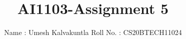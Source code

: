 \documentclass[journal,12pt,twocolumn]{IEEEtran}
\DeclareMathOperator*{\Res}{Res}
\begin{document}
\newcommand{\BEQA}{\begin{eqnarray}}
\newcommand{\EEQA}{\end{eqnarray}}
\newcommand{\define}{\stackrel{\triangle}{=}}
\newcommand{\R}{\mathbb{R}}

\raggedbottom
\setlength{\parindent}{0pt}
\providecommand{\mbf}{\mathbf}
\providecommand{\pr}[1]{\ensuremath{\Pr\left(#1\right)}}
\providecommand{\qfunc}[1]{\ensuremath{Q\left(#1\right)}}
\providecommand{\sbrak}[1]{\ensuremath{{}\left[#1\right]}}
\providecommand{\lsbrak}[1]{\ensuremath{{}\left[#1\right.}}
\providecommand{\rsbrak}[1]{\ensuremath{{}\left.#1\right]}}
\providecommand{\brak}[1]{\ensuremath{\left(#1\right)}}
\providecommand{\lbrak}[1]{\ensuremath{\left(#1\right.}}
\providecommand{\rbrak}[1]{\ensuremath{\left.#1\right)}}
\providecommand{\cbrak}[1]{\ensuremath{\left\{#1\right\}}}
\providecommand{\lcbrak}[1]{\ensuremath{\left\{#1\right.}}
\providecommand{\rcbrak}[1]{\ensuremath{\left.#1\right\}}}
\theoremstyle{remark}
\newtheorem{rem}{Remark}
\newcommand{\sgn}{\mathop{\mathrm{sgn}}}
\providecommand{\abs}[1]{\vert#1\vert}
\providecommand{\res}[1]{\Res\displaylimits_{#1}} 
\providecommand{\norm}[1]{\lVert#1\rVert}
\providecommand{\mtx}[1]{\mathbf{#1}}
\providecommand{\mean}[1]{E[ #1 ]}
\providecommand{\fourier}{\overset{\mathcal{F}}{ \rightleftharpoons}}
\providecommand{\system}{\overset{\mathcal{H}}{ \longleftrightarrow}}
\newcommand{\solution}{\noindent \textbf{Solution: }}
\newcommand{\cosec}{\,\text{cosec}\,}
\providecommand{\dec}[2]{\ensuremath{\overset{#1}{\underset{#2}{\gtrless}}}}
\newcommand{\myvec}[1]{\ensuremath{\begin{pmatrix}#1\end{pmatrix}}}
\newcommand{\mydet}[1]{\ensuremath{\begin{vmatrix}#1\end{vmatrix}}}
\makeatletter
{}
\makeatother
\let\StandardTheFigure\thefigure
\let\vec\mathbf
\renewcommand{\thefigure}{\theproblem}
\def\putbox#1#2#3{\makebox[0in][l]{\makebox[#1][l]{}\raisebox{\baselineskip}[0in][0in]{\raisebox{#2}[0in][0in]{#3}}}}
     \def\rightbox#1{\makebox[0in][r]{#1}}
     \def\centbox#1{\makebox[0in]{#1}}
     \def\topbox#1{\raisebox{-\baselineskip}[0in][0in]{#1}}
     \def\midbox#1{\raisebox{-0.5\baselineskip}[0in][0in]{#1}}
\vspace{3cm}
\title{AI1103-Assignment 5}
\author{Name : Umesh Kalvakuntla     Roll No. : CS20BTECH11024}
\maketitle
\newpage
\bigskip
\renewcommand{\thefigure}{\theenumi}
\renewcommand{\thetable}{\theenumi}
\end{document}
